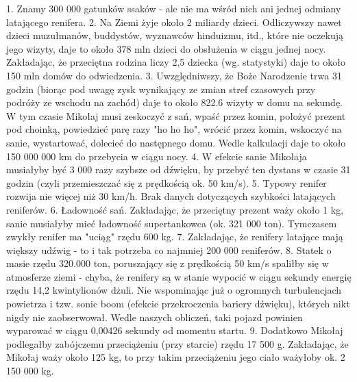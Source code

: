 \begin{parnumbers}
1. Znamy 300 000 gatunków ssaków - ale nie ma wśród nich ani jednej odmiany latającego renifera. 2. Na Ziemi żyje około 2 miliardy dzieci. Odliczywszy nawet dzieci muzułmanów, buddystów, wyznawców hinduizmu, itd., które nie oczekują jego wizyty, daje to około 378 mln dzieci do obsłużenia w ciągu jednej nocy. Zakładając, że przeciętna rodzina liczy 2,5 dziecka (wg. statystyki) daje to około 150 mln domów do odwiedzenia. 3. Uwzględniwszy, że Boże Narodzenie trwa 31 godzin (biorąc pod uwagę zysk wynikający ze zmian stref czasowych przy podróży ze wschodu na zachód) daje to około 822.6 wizyty w domu na sekundę. W tym czasie Mikołaj musi zeskoczyć z sań, wpaść przez komin, położyć prezent pod choinką, powiedzieć parę razy "ho ho ho", wrócić przez komin, wskoczyć na sanie, wystartować, dolecieć do następnego domu. Wedle kalkulacji daje to około 150 000 000 km do przebycia w ciągu nocy. 4. W efekcie sanie Mikołaja musiałyby być 3 000 razy szybsze od dźwięku, by przebyć ten dystans w czasie 31 godzin (czyli przemieszczać się z prędkością ok. 50 km/s). 5. Typowy renifer rozwija nie więcej niż 30 km/h. Brak danych dotyczących szybkości latających reniferów. 6. Ładowność sań. Zakładając, że przeciętny prezent waży około 1 kg, sanie musiałyby mieć ładowność supertankowca (ok. 321 000 ton). Tymczasem zwykły renifer ma "uciąg" rzędu 600 kg. 7. Zakładając, że renifery latające mają większy udźwig - to i tak potrzeba co najmniej 200 000 reniferów. 8. Statek o masie rzędu 320.000 ton, poruszający się z prędkością 50 km/s spaliłby się w atmosferze ziemi - chyba, że renifery są w stanie wypocić w ciągu sekundy energię rzędu 14,2 kwintylionów dżuli. Nie wspominając już o ogromnych turbulencjach powietrza i tzw. sonic boom (efekcie przekroczenia bariery dźwięku), których nikt nigdy nie zaobserwował. Wedle naszych obliczeń, taki pojazd powinien wyparować w ciągu 0,00426 sekundy od momentu startu. 9. Dodatkowo Mikołaj podlegałby zabójczemu przeciążeniu (przy starcie) rzędu 17 500 g. Zakładając, że Mikołaj waży około 125 kg, to przy takim przeciążeniu jego ciało ważyłoby ok. 2 150 000 kg.




























\end{parnumbers}
